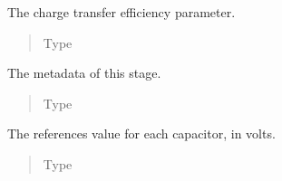 \documentclass[letterpaper,10pt,english]{sphinxmanual}
\begin{document}
\begin{fulllineitems}

\begin{fulllineitems}
\label{\detokenize{gen:calib.gen.StageParameters.eff}}
The charge transfer efficiency parameter.
\begin{quote}\begin{description}
\item[{Type}] \leavevmode
{}

\end{description}\end{quote}

\end{fulllineitems}


\begin{fulllineitems}
\label{\detokenize{gen:calib.gen.StageParameters.meta}}
The metadata of this stage.
\begin{quote}\begin{description}
\item[{Type}] \leavevmode
{\hyperref[\detokenize{gen:calib.gen.StageMeta}]{}}

\end{description}\end{quote}

\end{fulllineitems}


\begin{fulllineitems}
\label{\detokenize{gen:calib.gen.StageParameters.refs}}
The references value for each capacitor, in volts.
\begin{quote}\begin{description}
\item[{Type}] \leavevmode
{}


\end{description}
\end{quote}
\end{fulllineitems}
\end{fulllineitems}
\end{document}
